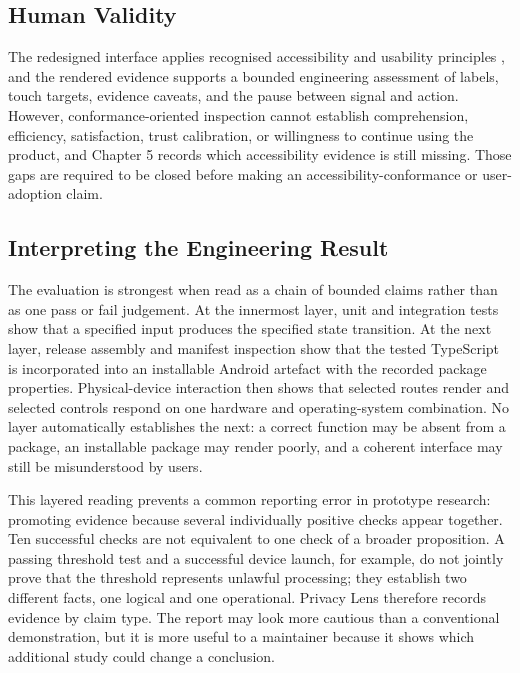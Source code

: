 \subsection{Human Validity}

The redesigned interface applies recognised accessibility and usability principles \cite{wcag22,androidAccessibility,iso924111}, and the rendered evidence supports a bounded engineering assessment of labels, touch targets, evidence caveats, and the pause between signal and action. However, conformance-oriented inspection cannot establish comprehension, efficiency, satisfaction, trust calibration, or willingness to continue using the product, and Chapter 5 records which accessibility evidence is still missing. Those gaps are required to be closed before making an accessibility-conformance or user-adoption claim.


\subsection{Interpreting the Engineering Result}

The evaluation is strongest when read as a chain of bounded claims rather than as one pass or fail judgement. At the innermost layer, unit and integration tests show that a specified input produces the specified state transition. At the next layer, release assembly and manifest inspection show that the tested TypeScript is incorporated into an installable Android artefact with the recorded package properties. Physical-device interaction then shows that selected routes render and selected controls respond on one hardware and operating-system combination. No layer automatically establishes the next: a correct function may be absent from a package, an installable package may render poorly, and a coherent interface may still be misunderstood by users.

This layered reading prevents a common reporting error in prototype research: promoting evidence because several individually positive checks appear together. Ten successful checks are not equivalent to one check of a broader proposition. A passing threshold test and a successful device launch, for example, do not jointly prove that the threshold represents unlawful processing; they establish two different facts, one logical and one operational. Privacy Lens therefore records evidence by claim type. The report may look more cautious than a conventional demonstration, but it is more useful to a maintainer because it shows which additional study could change a conclusion.

